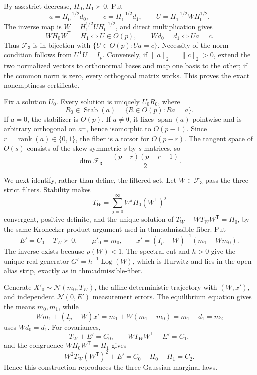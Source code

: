 By \(\text{ass:strict-decrease}\), \(H_0,H_1\succ0\).  Put
\[
 a=H_0^{-1/2}d_0,\qquad c=H_1^{-1/2}d_1,\qquad
 U=H_1^{-1/2}WH_0^{1/2}.
\]
The inverse map is \(W=H_1^{1/2}UH_0^{-1/2}\), and direct multiplication gives
\[
 WH_0W^{\mathsf T}=H_1\Longleftrightarrow U\in O(p),
 \qquad Wd_0=d_1\Longleftrightarrow Ua=c.
\]
Thus \(\mathcal F_3\) is in bijection with \(\{U\in O(p):Ua=c\}\).  Necessity of the norm condition follows from \(U^{\mathsf T}U=I_p\).  Conversely, if \(\lVert a\rVert_2=\lVert c\rVert_2>0\), extend the two normalized vectors to orthonormal bases and map one basis to the other; if the common norm is zero, every orthogonal matrix works.  This proves the exact nonemptiness certificate.

Fix a solution \(U_0\).  Every solution is uniquely \(U_0R_0\), where
\[
 R_0\in\operatorname{Stab}(a)=\{R\in O(p):Ra=a\}.
\]
If \(a=0\), the stabilizer is \(O(p)\).  If \(a\ne0\), it fixes \(\operatorname{span}(a)\) pointwise and is arbitrary orthogonal on \(a^\perp\), hence isomorphic to \(O(p-1)\).  Since \(r=\operatorname{rank}(a)\in\{0,1\}\), the fiber is a torsor for \(O(p-r)\).  The tangent space of \(O(s)\) consists of the skew-symmetric \(s\)-by-\(s\) matrices, so
\[
 \dim\mathcal F_3=\frac{(p-r)(p-r-1)}2.
\]

We next identify, rather than define, the filtered set.  Let \(W\in\mathcal F_3\) pass the three strict filters.  Stability makes
\[
 T_W=\sum_{j=0}^{\infty}W^jH_0(W^{\mathsf T})^j
\]
convergent, positive definite, and the unique solution of \(T_W-WT_WW^{\mathsf T}=H_0\), by the same Kronecker-product argument used in \(\text{thm:admissible-fiber}\).  Put
\[
 E'=C_0-T_W\succ0,\qquad \mu'_0=m_0,\qquad
 x'=(I_p-W)^{-1}(m_1-Wm_0).
\]
The inverse exists because \(\rho(W)<1\).  The spectral cut and \(h>0\) give the unique real generator \(G'=h^{-1}\operatorname{Log}(W)\), which is Hurwitz and lies in the open alias strip, exactly as in \(\text{thm:admissible-fiber}\).

Generate \(X'_0\sim\mathcal N(m_0,T_W)\), the affine deterministic trajectory with \((W,x')\), and independent \(\mathcal N(0,E')\) measurement errors.  The equilibrium equation gives the means \(m_0,m_1\), while
\[
 Wm_1+(I_p-W)x'=m_1+W(m_1-m_0)=m_1+d_1=m_2
\]
uses \(Wd_0=d_1\).  For covariances,
\[
 T_W+E'=C_0,\qquad WT_WW^{\mathsf T}+E'=C_1,
\]
and the congruence \(WH_0W^{\mathsf T}=H_1\) gives
\[
 W^2T_W(W^{\mathsf T})^2+E'
 =C_0-H_0-H_1=C_2.
\]
Hence this construction reproduces the three Gaussian marginal laws.


